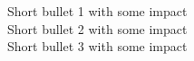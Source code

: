 \textbullet{} Short bullet 1 with some impact \\
\textbullet{} Short bullet 2 with some impact \\
\textbullet{} Short bullet 3 with some impact
